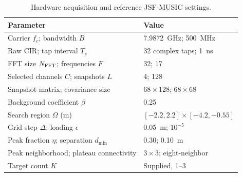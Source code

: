\begin{table}[t]
\centering
\caption{Hardware acquisition and reference JSF-MUSIC settings.}
\label{tab:hardware_settings}
\footnotesize
\setlength{\tabcolsep}{3pt}
\begin{tabular}{p{}p{}}
\hline
Parameter & Value \\
\hline
Carrier $f_c$; bandwidth $B$ & 7.9872~GHz; 500~MHz \\
Raw CIR; tap interval $T_s$ & 32 complex taps; 1~ns \\
FFT size $N_{\rm FFT}$; frequencies $F$ & 32; 17 \\
Selected channels $C$; snapshots $L$ & 4; 128 \\
Snapshot matrix; covariance size & $68\times128$; $68\times68$ \\
Background coefficient $\beta$ & 0.25 \\
Search region $\Omega$ (m) & $[-2.2,2.2]\times[-4.2,-0.55]$ \\
Grid step $\Delta$; loading $\epsilon$ & 0.05~m; $10^{-5}$ \\
Peak fraction $\eta$; separation $d_{\min}$ & 0.30; 0.10~m \\
Peak neighborhood; plateau connectivity & $3\times3$; eight-neighbor \\
Target count $K$ & Supplied, 1--3 \\
\hline
\end{tabular}
\end{table}
